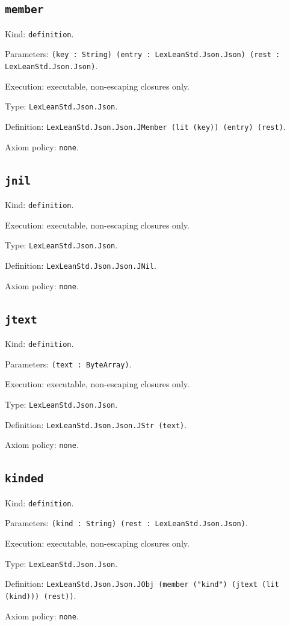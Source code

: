 \documentclass[11pt]{article}
\begin{document}
\subsection*{\texttt{member}}
\noindent Kind: \texttt{definition}.\par
\noindent Parameters: \texttt{(key : String) (entry : LexLeanStd.Json.Json) (rest : LexLeanStd.Json.Json)}.\par
\noindent Execution: executable, non-escaping closures only.\par
\noindent Type: \texttt{LexLeanStd.Json.Json}.\par
\noindent Definition: \texttt{LexLeanStd.Json.Json.JMember (lit (key)) (entry) (rest)}.\par
\noindent Axiom policy: \texttt{none}.\par
\subsection*{\texttt{jnil}}
\noindent Kind: \texttt{definition}.\par
\noindent Execution: executable, non-escaping closures only.\par
\noindent Type: \texttt{LexLeanStd.Json.Json}.\par
\noindent Definition: \texttt{LexLeanStd.Json.Json.JNil}.\par
\noindent Axiom policy: \texttt{none}.\par
\subsection*{\texttt{jtext}}
\noindent Kind: \texttt{definition}.\par
\noindent Parameters: \texttt{(text : ByteArray)}.\par
\noindent Execution: executable, non-escaping closures only.\par
\noindent Type: \texttt{LexLeanStd.Json.Json}.\par
\noindent Definition: \texttt{LexLeanStd.Json.Json.JStr (text)}.\par
\noindent Axiom policy: \texttt{none}.\par
\subsection*{\texttt{kinded}}
\noindent Kind: \texttt{definition}.\par
\noindent Parameters: \texttt{(kind : String) (rest : LexLeanStd.Json.Json)}.\par
\noindent Execution: executable, non-escaping closures only.\par
\noindent Type: \texttt{LexLeanStd.Json.Json}.\par
\noindent Definition: \texttt{LexLeanStd.Json.Json.JObj (member ("kind") (jtext (lit (kind))) (rest))}.\par
\noindent Axiom policy: \texttt{none}.\par
\end{document}

